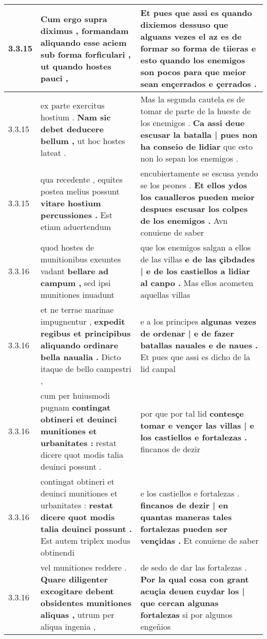 \begin{tabular}{|p{1cm}|p{6.5cm}|p{6.5cm}|}
3.3.15 & Cum ergo supra diximus , \textbf{ formandam aliquando esse aciem sub forma forficulari , } ut quando hostes pauci , & Et pues que assi es quando dixiemos dessuso que \textbf{ alguans vezes el az es de formar so forma de tiieras e esto quando los enemigos son pocos } para que meior sean ençerrados e çerrados . \\\hline
3.3.15 & ex parte exercitus hostium . \textbf{ Nam sic debet deducere bellum , } ut hoc hostes lateat . & Mas la segunda cautela es de tomar de parte de la hueste de los enemigos . \textbf{ Ca assi deue escusar la batalla | pues non ha conseio de lidiar } que esto non lo sepan los enemigos . \\\hline
3.3.15 & qua recedente , equites postea melius possunt \textbf{ vitare hostium percussiones . } Est etiam aduertendum & encubiertamente se escusa yendo se los peones . \textbf{ Et ellos ydos los caualleros pueden meior despues escusar los colpes de los enemigos . } Avn conuiene de saber \\\hline
3.3.16 & quod hostes de munitionibus exeuntes vadant \textbf{ bellare ad campum , } sed ipsi munitiones inuadunt & que los enemigos salgan a ellos de las villas \textbf{ e de las çibdades | e de los castiellos a lidiar al canpo . } Mas ellos acometen aquellas villas \\\hline
3.3.16 & et ne terrae marinae impugnentur , \textbf{ expedit regibus et principibus aliquando ordinare bella naualia . } Dicto itaque de bello campestri , & e a los principes \textbf{ algunas vezes de ordenar | e de fazer batallas nauales e de naues . } Et pues que assi es dicho de la lid canpal \\\hline
3.3.16 & cum per huiusmodi pugnam \textbf{ contingat obtineri et deuinci munitiones et urbanitates : } restat dicere quot modis talia deuinci possunt . & por que por tal lid \textbf{ contesçe tomar e vençer las villas | e los castiellos e fortalezas . } fincanos de dezir \\\hline
3.3.16 & contingat obtineri et deuinci munitiones et urbanitates : \textbf{ restat dicere quot modis talia deuinci possunt . } Est autem triplex modus obtinendi & e los castiellos e fortalezas . \textbf{ fincanos de dezir | en quantas maneras tales fortalezas pueden ser vençidas . } Et conuiene de saber \\\hline
3.3.16 & vel munitiones reddere . \textbf{ Quare diligenter excogitare debent obsidentes munitiones aliquas , } utrum per aliqua ingenia , & de sedo de dar las fortalezas . \textbf{ Por la qual cosa con grant acuçia deuen cuydar los | que cercan algunas fortalezas } si por algunos engeñios \\\hline

\end{tabular}
